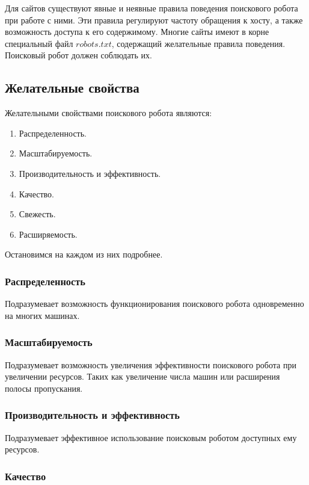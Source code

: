 Для сайтов существуют явные и неявные правила поведения поискового робота при работе с ними. Эти правила регулируют частоту обращения к хосту, а также возможность доступа к его содержимому. Многие сайты имеют в корне специальный файл $robots.txt$, содержащий желательные правила поведения. Поисковый робот должен соблюдать их.

\subsection{Желательные свойства}

Желательными свойствами поискового робота являются:

\begin{enumerate}
\item Распределенность.
\item Масштабируемость.
\item Производительность и эффективность.
\item Качество.
\item Свежесть.
\item Расширяемость.
\end{enumerate}

Остановимся на каждом из них подробнее.

\subsubsection*{Распределенность}

Подразумевает возможность функционирования поискового робота одновременно на многих машинах.

\subsubsection*{Масштабируемость}

Подразумевает возможность увеличения эффективности поискового робота при увеличении ресурсов. Таких как увеличение числа машин или расширения полосы пропускания.

\subsubsection*{Производительность и эффективность}

Подразумевает эффективное использование поисковым роботом доступных ему ресурсов. 

\subsubsection*{Качество}


